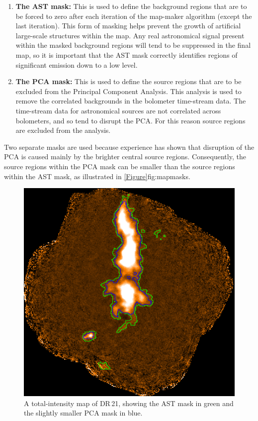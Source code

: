 \begin{enumerate}
\item {\bf The AST mask:} This is used to define the background regions that are to be 
forced to zero after each iteration of the map-maker algorithm (except the last
iteration). This form of masking helps prevent the growth of artificial large-scale 
structures within the map. Any real astronomical signal present within the masked
background regions will tend to be suppressed in the final map, so it is important
that the AST mask correctly identifies regions of significant emission down to a low level.

\item {\bf The PCA mask:} This is used to define the source regions that are
to be excluded from the Principal Component Analysis. This analysis is used to
remove the correlated backgrounds in the bolometer time-stream data. The
time-stream data for astronomical sources are not correlated across
bolometers, and so tend to disrupt the PCA. For this reason source regions are
excluded from the analysis. \end{enumerate}

Two separate masks are used because experience has shown that disruption of
the PCA is caused mainly by the brighter central source regions. Consequently,
the source regions within the PCA mask can be smaller than the source regions
within the AST mask, as illustrated in \cref{Figure}{fig:mapmasks}{}.

\begin{figure}[ht!]
\begin{center}
\includegraphics[width=0.7\linewidth]{sc-22-map-masks-1.png}
\caption [Example POL-2 map of DR\,21, showing the difference between the two
  \poltwomap\ masks.]{A total-intensity map of DR\,21, showing the AST mask in green and
  the slightly smaller PCA mask in blue.
\label{fig:mapmasks}
}
\end{center}
\end{figure}

